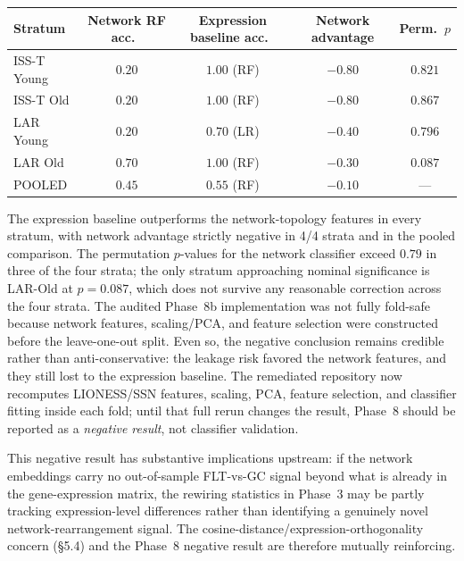\documentclass[11pt]{article}
\begin{document}
\begin{center}
\small
\begin{tabular}{lcccc}
\toprule
Stratum & Network RF acc.\ & Expression baseline acc.\ & Network advantage & Perm.\ $p$ \\
\midrule
ISS-T Young & $0.20$ & $1.00$ (RF) & $-0.80$ & $0.821$ \\
ISS-T Old   & $0.20$ & $1.00$ (RF) & $-0.80$ & $0.867$ \\
LAR Young   & $0.20$ & $0.70$ (LR) & $-0.40$ & $0.796$ \\
LAR Old     & $0.70$ & $1.00$ (RF) & $-0.30$ & $0.087$ \\
\midrule
POOLED      & $0.45$ & $0.55$ (RF) & $-0.10$ & --- \\
\bottomrule
\end{tabular}
\end{center}

\noindent The expression baseline outperforms the network-topology features in every stratum, with network advantage strictly negative in 4/4 strata and in the pooled comparison. The permutation $p$-values for the network classifier exceed $0.79$ in three of the four strata; the only stratum approaching nominal significance is LAR-Old at $p{=}0.087$, which does not survive any reasonable correction across the four strata. The audited Phase~8b implementation was not fully fold-safe because network features, scaling/PCA, and feature selection were constructed before the leave-one-out split. Even so, the negative conclusion remains credible rather than anti-conservative: the leakage risk favored the network features, and they still lost to the expression baseline. The remediated repository now recomputes LIONESS/SSN features, scaling, PCA, feature selection, and classifier fitting inside each fold; until that full rerun changes the result, Phase~8 should be reported as a \emph{negative result}, not classifier validation.

This negative result has substantive implications upstream: if the network embeddings carry no out-of-sample FLT-vs-GC signal beyond what is already in the gene-expression matrix, the rewiring statistics in Phase~3 may be partly tracking expression-level differences rather than identifying a genuinely novel network-rearrangement signal. The cosine-distance/expression-orthogonality concern (\S 5.4) and the Phase~8 negative result are therefore mutually reinforcing.
\end{document}
